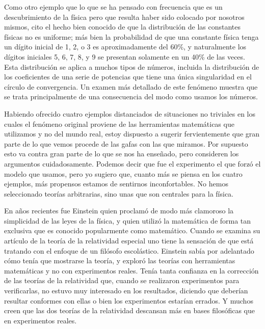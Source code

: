 \documentclass[a4paper, 12pt]{article}
\begin{document}
 

Como otro ejemplo que lo que se ha pensado con frecuencia que es un descubrimiento de la física pero que resulta haber sido colocado por nosotros mismos, cito el hecho bien conocido de que la distribución de las constantes físicas no es uniforme; más bien la probabilidad de que una constante física tenga un dígito inicial de 1, 2, o 3 es aproximadamente del 60\%, y naturalmente los dígitos iniciales 5, 6, 7, 8, y 9 se presentan solamente en un 40\% de las veces. Esta distribución se aplica a muchos tipos de números, incluida la distribución de los coeficientes de una serie de potencias que tiene una única singularidad en el círculo de convergencia. Un examen más detallado de este fenómeno muestra que se trata principalmente de una consecuencia del modo como usamos los números.

 

Habiendo ofrecido cuatro ejemplos distanciados de situaciones no triviales en los cuales el fenómeno original proviene de las herramientas matemáticas que utilizamos y no del mundo real, estoy dispuesto a sugerir fervientemente que gran parte de lo que vemos procede de las gafas con las que miramos. Por supuesto esto va contra gran parte de lo que se nos ha enseñado, pero consideren los argumentos cuidadosamente. Podemos decir que fue el experimento el que forzó el modelo que usamos, pero yo sugiero que, cuanto más se piensa en los cuatro ejemplos, más propensos estamos de sentirnos inconfortables. No hemos seleccionado teorías arbitrarias, sino unas que son centrales para la física.

 

En años recientes fue Einstein quien proclamó de modo más clamoroso la simplicidad de las leyes de la física, y quien utilizó la matemática de forma tan exclusiva que es conocido popularmente como matemático. Cuando se examina su artículo de la teoría de la relatividad especial  uno tiene la sensación de que está tratando con el enfoque de un filósofo escolástico. Einstein sabía por adelantado cómo tenía que mostrarse la teoría, y exploró las teorías con herramientas matemáticas y no con experimentos reales. Tenía tanta confianza en la corrección de las teorías de la relatividad que, cuando se realizaron experimentos para verificarlas, no estuvo muy interesado en los resultados, diciendo que deberían resultar conformes con ellas o bien los experimentos estarían errados. Y muchos creen que las dos teorías de la relatividad descansan más en bases filosóficas que en experimentos reales.
\end{document}
